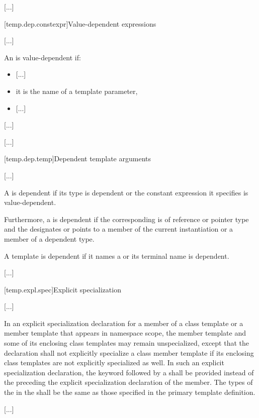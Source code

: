 \documentclass{wg21}
\begin{document}
\textcolor{noteclr}{[...]}

[temp.dep.constexpr]{Value-dependent expressions}

\textcolor{noteclr}{[...]}

\pnum
An
is value-dependent if:
\begin{itemize}
    \item
    \textcolor{noteclr}{[...]}
    \item
    it is the name of a  template parameter,
    \item
    \textcolor{noteclr}{[...]}
\end{itemize}
\textcolor{noteclr}{[...]}

\textcolor{noteclr}{[...]}

[temp.dep.temp]{Dependent template arguments}

\textcolor{noteclr}{[...]}

\pnum
A 
is dependent if its type is dependent or the constant
expression it specifies is value-dependent.

\pnum
Furthermore, a 
is dependent if the corresponding 
is of reference or pointer type and the 
designates or points to a member of the current instantiation or a member of
a dependent type.

\pnum
A template  is dependent if
it names a  or
its terminal name is dependent.

\textcolor{noteclr}{[...]}

[temp.expl.spec]{Explicit specialization}

\textcolor{noteclr}{[...]}

\pnum
In an explicit specialization declaration for a member of a class template or
a member template that appears in namespace scope,
the member template and some of its enclosing class templates may remain
unspecialized,
except that the declaration shall not explicitly specialize a class member
template if its enclosing class templates are not explicitly specialized
as well.
In such an explicit specialization declaration, the keyword
followed by a
shall be provided instead of the
preceding the explicit specialization declaration of the member.
The types  of the
in the
shall be the same as those specified in the primary template definition.
\begin{example}
    \textcolor{noteclr}{[...]}
\end{example}
\end{document}
